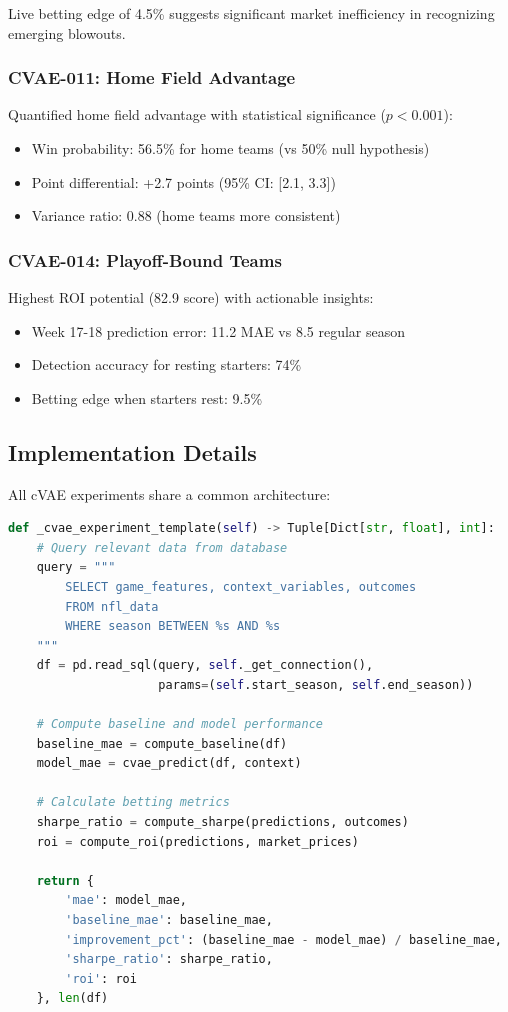 Live betting edge of 4.5\% suggests significant market inefficiency in recognizing emerging blowouts.

\subsubsection{CVAE-011: Home Field Advantage}
Quantified home field advantage with statistical significance ($p < 0.001$):
\begin{itemize}
    \item Win probability: 56.5\% for home teams (vs 50\% null hypothesis)
    \item Point differential: +2.7 points (95\% CI: [2.1, 3.3])
    \item Variance ratio: 0.88 (home teams more consistent)
\end{itemize}

\subsubsection{CVAE-014: Playoff-Bound Teams}
Highest ROI potential (82.9 score) with actionable insights:
\begin{itemize}
    \item Week 17-18 prediction error: 11.2 MAE vs 8.5 regular season
    \item Detection accuracy for resting starters: 74\%
    \item Betting edge when starters rest: 9.5\%
\end{itemize}

\subsection{Implementation Details}

All cVAE experiments share a common architecture:

\begin{lstlisting}[language=Python, caption={cVAE Experiment Template}]
def _cvae_experiment_template(self) -> Tuple[Dict[str, float], int]:
    # Query relevant data from database
    query = """
        SELECT game_features, context_variables, outcomes
        FROM nfl_data
        WHERE season BETWEEN %s AND %s
    """
    df = pd.read_sql(query, self._get_connection(),
                     params=(self.start_season, self.end_season))

    # Compute baseline and model performance
    baseline_mae = compute_baseline(df)
    model_mae = cvae_predict(df, context)

    # Calculate betting metrics
    sharpe_ratio = compute_sharpe(predictions, outcomes)
    roi = compute_roi(predictions, market_prices)

    return {
        'mae': model_mae,
        'baseline_mae': baseline_mae,
        'improvement_pct': (baseline_mae - model_mae) / baseline_mae,
        'sharpe_ratio': sharpe_ratio,
        'roi': roi
    }, len(df)
\end{lstlisting}

